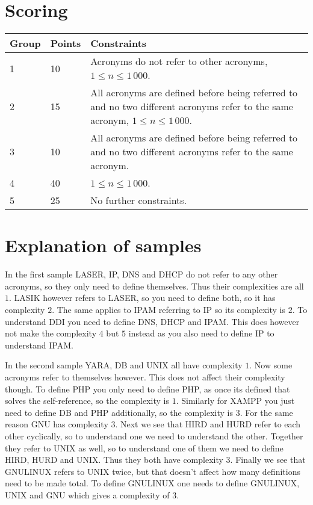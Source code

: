 \section*{Scoring}
\begin{tabular}{|l|l|l|}
\hline
Group & Points & Constraints \\ \hline
1     & 10     & Acronyms do not refer to other acronyms, $1 \leq n \leq 1 \, 000$. \\ \hline
2     & 15     & All acronyms are defined before being referred to and no two different acronyms refer to the same acronym, $1 \leq n \leq 1 \, 000$. \\ \hline
3     & 10     & All acronyms are defined before being referred to and no two different acronyms refer to the same acronym. \\ \hline
4     & 40     & $1 \leq n \leq 1 \, 000$.  \\ \hline
5     & 25     & No further constraints.  \\ \hline
\end{tabular}

\section*{Explanation of samples}

In the first sample LASER, IP, DNS and DHCP do not refer to any other acronyms, so they only need to define themselves.
Thus their complexities are all $1$.
LASIK however refers to LASER, so you need to define both, so it has complexity $2$. 
The same applies to IPAM referring to IP so its complexity is $2$.
To understand DDI you need to define DNS, DHCP and IPAM.
This does however not make the complexity $4$ but $5$ instead as you also need to define IP to understand IPAM.

In the second sample YARA, DB and UNIX all have complexity $1$.
Now some acronyms refer to themselves however.
This does not affect their complexity though.
To define PHP you only need to define PHP, as once its defined that solves the self-reference, so the complexity is $1$.
Similarly for XAMPP you just need to define DB and PHP additionally, so the complexity is $3$.
For the same reason GNU has complexity $3$.
Next we see that HIRD and HURD refer to each other cyclically, so to understand one we need to understand the other.
Together they refer to UNIX as well, so to understand one of them we need to define HIRD, HURD and UNIX.
Thus they both have complexity $3$.
Finally we see that GNULINUX refers to UNIX twice, but that doesn't affect how many definitions need to be made total.
To define GNULINUX one needs to define GNULINUX, UNIX and GNU which gives a complexity of $3$.
